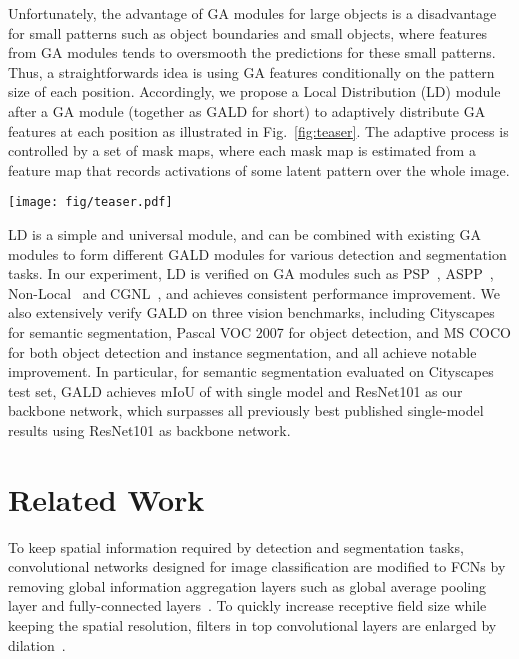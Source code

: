 \documentclass{bmvc2k}
\begin{document}
Unfortunately, the advantage of GA modules for large objects is a disadvantage for small patterns such as object boundaries and small objects, where features from GA modules tends to oversmooth the predictions for these small patterns. Thus, a straightforwards idea is using GA features conditionally on the pattern size of each position. Accordingly, we propose a Local Distribution (LD) module after a GA module (together as GALD for short) to adaptively distribute GA features at each position as illustrated in Fig.~\ref{fig:teaser}. The adaptive process is controlled by a set of mask maps, where each mask map is estimated from a feature map that records activations of some latent pattern over the whole image. 

\begin{figure*}
\centering
\texttt{[image: fig/teaser.pdf]}
\caption{Our proposed GALD framework for semantic segmentation task. The imbalanced spread of information from small and large patterns in GA module is appropriately handled through LD module.
}
\label{fig:teaser}
\end{figure*}

LD is a simple and universal module, and can be combined with existing GA modules to form different GALD modules for various detection and segmentation tasks. In our experiment, LD is verified on GA modules such as PSP~\cite{pspnet}, ASPP~\cite{deeplabv2}, Non-Local~\cite{Nonlocal} and CGNL~\cite{cgnl}, and achieves consistent performance improvement. We also extensively verify GALD on three vision benchmarks, including Cityscapes for semantic segmentation, Pascal VOC 2007 for object detection, and MS COCO for both object detection and instance segmentation, and all achieve notable improvement. In particular, for semantic segmentation evaluated on Cityscapes test set, GALD achieves mIoU of  with single model and ResNet101 as our backbone network, which surpasses all previously best published single-model results using ResNet101 as backbone network.


 \section{Related Work}
\label{sec:related}
To keep spatial information required by detection and segmentation tasks, convolutional networks designed for image classification are modified to FCNs by removing global information aggregation layers such as global average pooling layer and fully-connected layers~\cite{fcn}. To quickly increase receptive field size while keeping the spatial resolution, filters in top convolutional layers are enlarged by dilation~\cite{deeplabv1, deeplabv2}. 
\end{document}
